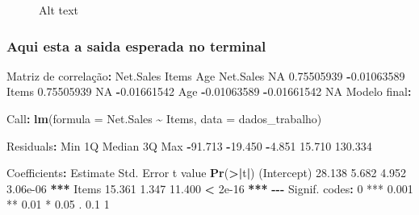 \documentclass[
]{article}
\makeatletter
\newenvironment{Shaded}{\begin{snugshade}}{\end{snugshade}}
\newcommand{\AttributeTok}[1]{\textcolor[rgb]{0.13,0.29,0.53}{#1}}
\newcommand{\ConstantTok}[1]{\textcolor[rgb]{0.56,0.35,0.01}{#1}}
\newcommand{\DecValTok}[1]{\textcolor[rgb]{0.00,0.00,0.81}{#1}}
\newcommand{\ErrorTok}[1]{\textcolor[rgb]{0.64,0.00,0.00}{\textbf{#1}}}
\newcommand{\FloatTok}[1]{\textcolor[rgb]{0.00,0.00,0.81}{#1}}
\newcommand{\FunctionTok}[1]{\textcolor[rgb]{0.13,0.29,0.53}{\textbf{#1}}}
\newcommand{\NormalTok}[1]{#1}
\newcommand{\SpecialCharTok}[1]{\textcolor[rgb]{0.81,0.36,0.00}{\textbf{#1}}}
\newcommand{\StringTok}[1]{\textcolor[rgb]{0.31,0.60,0.02}{#1}}
\newcommand*\pandocbounded[1]{%
  \sbox\pandoc@box{#1}%
  \Gscale@div\@tempa{\textheight}{\dimexpr\ht\pandoc@box+\dp\pandoc@box\relax}%
  \Gscale@div\@tempb{\linewidth}{\wd\pandoc@box}%
  \ifdim\@tempb\p@<\@tempa\p@\let\@tempa\@tempb\fi%
  \ifdim\@tempa\p@<\p@\scalebox{\@tempa}{\usebox\pandoc@box}%
  \else\usebox{\pandoc@box}%
  \fi%
}
\makeatother
\begin{document}
\begin{figure}
\centering
\pandocbounded{\texttt{[image: 14.png]}}
\caption{Alt text}
\end{figure}

\subsubsection{Aqui esta a saida esperada no
terminal}\label{aqui-esta-a-saida-esperada-no-terminal}

\begin{Shaded}
\begin{Highlighting}[]
\NormalTok{Matriz de correlação}\SpecialCharTok{:}
\NormalTok{            Net.Sales       Items         Age}
\NormalTok{Net.Sales          }\ConstantTok{NA}  \FloatTok{0.75505939} \SpecialCharTok{{-}}\FloatTok{0.01063589}
\NormalTok{Items      }\FloatTok{0.75505939}          \ConstantTok{NA} \SpecialCharTok{{-}}\FloatTok{0.01661542}
\NormalTok{Age       }\SpecialCharTok{{-}}\FloatTok{0.01063589} \SpecialCharTok{{-}}\FloatTok{0.01661542}          \ConstantTok{NA}
\NormalTok{Modelo final}\SpecialCharTok{:}

\NormalTok{Call}\SpecialCharTok{:}
\FunctionTok{lm}\NormalTok{(}\AttributeTok{formula =}\NormalTok{ Net.Sales }\SpecialCharTok{\textasciitilde{}}\NormalTok{ Items, }\AttributeTok{data =}\NormalTok{ dados\_trabalho)}

\NormalTok{Residuals}\SpecialCharTok{:}
\NormalTok{    Min      }\DecValTok{1}\NormalTok{Q  Median      }\DecValTok{3}\NormalTok{Q     Max}
\SpecialCharTok{{-}}\FloatTok{91.713} \SpecialCharTok{{-}}\FloatTok{19.450}  \SpecialCharTok{{-}}\FloatTok{4.851}  \FloatTok{15.710} \FloatTok{130.334}

\NormalTok{Coefficients}\SpecialCharTok{:}
\NormalTok{            Estimate Std. Error t value }\FunctionTok{Pr}\NormalTok{(}\SpecialCharTok{\textgreater{}}\ErrorTok{|}\NormalTok{t}\SpecialCharTok{|}\NormalTok{)    }
\NormalTok{(Intercept)   }\FloatTok{28.138}      \FloatTok{5.682}   \FloatTok{4.952} \FloatTok{3.06e{-}06} \SpecialCharTok{**}\ErrorTok{*}
\NormalTok{Items         }\FloatTok{15.361}      \FloatTok{1.347}  \FloatTok{11.400}  \SpecialCharTok{\textless{}} \FloatTok{2e{-}16} \SpecialCharTok{**}\ErrorTok{*}
\SpecialCharTok{{-}{-}{-}}
\NormalTok{Signif. codes}\SpecialCharTok{:}  \DecValTok{0} \StringTok{\textquotesingle{}***\textquotesingle{}} \FloatTok{0.001} \StringTok{\textquotesingle{}**\textquotesingle{}} \FloatTok{0.01} \StringTok{\textquotesingle{}*\textquotesingle{}} \FloatTok{0.05} \StringTok{\textquotesingle{}.\textquotesingle{}} \FloatTok{0.1} \StringTok{\textquotesingle{} \textquotesingle{}} \DecValTok{1}


\end{Highlighting}
\end{Shaded}
\end{document}
